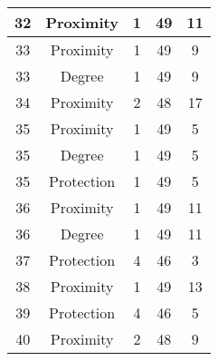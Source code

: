 \documentclass[results.tex]{subfiles}
\begin{document}
\begin{center}
\begin{tabular}{| c || c | c | c | c |}
            \hline
            32                      & Proximity                    & 1                      & 49                      & 11                   \\
            \hline
            33                      & Proximity                    & 1                      & 49                      & 9                    \\
            \hline
            33                      & Degree                       & 1                      & 49                      & 9                    \\
            \hline
            34                      & Proximity                    & 2                      & 48                      & 17                   \\
            \hline
            35                      & Proximity                    & 1                      & 49                      & 5                    \\
            \hline
            35                      & Degree                       & 1                      & 49                      & 5                    \\
            \hline
            35                      & Protection                   & 1                      & 49                      & 5                    \\
            \hline
            36                      & Proximity                    & 1                      & 49                      & 11                   \\
            \hline
            36                      & Degree                       & 1                      & 49                      & 11                   \\
            \hline
            37                      & Protection                   & 4                      & 46                      & 3                    \\
            \hline
            38                      & Proximity                    & 1                      & 49                      & 13                   \\
            \hline
            39                      & Protection                   & 4                      & 46                      & 5                    \\
            \hline
            40                      & Proximity                    & 2                      & 48                      & 9                    \\

\end{tabular}
\end{center}
\end{document}
